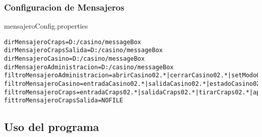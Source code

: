 \subsubsection{Configuracion de Mensajeros}
\label{sec:ConfiguracionDeMensajeros}
mensajeroConfig.properties
\begin{framed}
\begin{lstlisting}[breaklines=true]
dirMensajeroCraps=D:/casino/messageBox
dirMensajeroCrapsSalida=D:/casino/messageBox
dirMensajeroCasino=D:/casino/messageBox
dirMensajeroAdministracion=D:/casino/messageBox
filtroMensajeroAdministracion=abrirCasino02.*|cerrarCasino02.*|setModo02.*|setJugada02.*|reporteRankingJugadores02.*|reporteEstadoActual02.*
filtroMensajeroCasino=entradaCasino02.*|salidaCasino02.*|estadoCasino02.*
filtroMensajeroCraps=entradaCraps02.*|salidaCraps02.*|tirarCraps02.*|apostarCraps02.*
fittroMensajeroCrapsSalida=NOFILE
\end{lstlisting}
\end{framed}

\subsection{Uso del programa}
\label{sec:UsoDelPrograma}